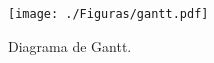 \documentclass[
11pt, %
]{charter}
\begin{document}
\begin{figure}[htpb]
\centering 
\texttt{[image: ./Figuras/gantt.pdf]}
\caption{Diagrama de Gantt.}
\label{fig:diagGantt}
\end{figure} 

%
%
%
%
%
%
\end{document}

